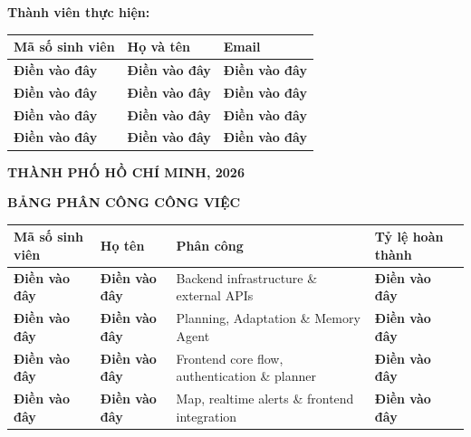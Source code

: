 \documentclass[12pt,a4paper]{article}
\newcommand{\dienvao}{\textbf{Điền vào đây}}
\begin{document}
\begin{titlepage}
\begin{center}
        \vfill
        \textbf{Thành viên thực hiện:} \\
        \vspace{0.5cm}
        \begin{tabular}{|l|l|l|}
            \hline
            \textbf{Mã số sinh viên} & \textbf{Họ và tên} & \textbf{Email} \\
            \hline
            \dienvao & \dienvao & \dienvao \\
            \hline
            \dienvao & \dienvao & \dienvao \\
            \hline
            \dienvao & \dienvao & \dienvao \\
            \hline
            \dienvao & \dienvao & \dienvao \\
            \hline
        \end{tabular}

        \vfill
        {\fontsize{14pt}{20pt}\selectfont \textbf{THÀNH PHỐ HỒ CHÍ MINH, 2026}}
    \end{center}
\end{titlepage}

\newpage
\pagestyle{empty}
\begin{center}
{\LARGE\bfseries BẢNG PHÂN CÔNG CÔNG VIỆC}
\end{center}
\vspace{1.0cm}

\renewcommand{\arraystretch}{2.0}
\begin{center}
\begin{tabular}{|C{2.5cm}|C{3.5cm}|C{5.0cm}|C{2.8cm}|}
    \hline
    \textbf{Mã số sinh viên} & \textbf{Họ tên} & \textbf{Phân công} & \textbf{Tỷ lệ hoàn thành} \\ \hline
    \dienvao & \dienvao & Backend infrastructure \& external APIs & \dienvao \\ \hline
    \dienvao & \dienvao & Planning, Adaptation \& Memory Agent & \dienvao \\ \hline
    \dienvao & \dienvao & Frontend core flow, authentication \& planner & \dienvao \\ \hline
    \dienvao & \dienvao & Map, realtime alerts \& frontend integration & \dienvao \\ \hline
\end{tabular}
\end{center}
\renewcommand{\arraystretch}{1.0}
\end{document}
